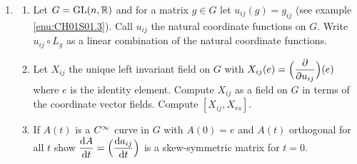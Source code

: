 \documentclass[../main]{subfiles}
\begin{document}
\begin{enumerate}
\item\label{pro:21}
\begin{enumerate}[label=(\roman{enumii})]
    \item Let $G=\mathrm{GL}(n,\mathbb{R})$ and for a matrix $g \in G$ let $u_{i j} (g) = g_{i  j}$ (see example \ref{enu:CH01S01.3}). Call $u_{i  j}$ the natural coordinate functions on $G$. Write $u_{i  j} \circ L_g$ as a linear combination of the natural coordinate functions.
    \item Let $X_{i  j}$ the unique left invariant field on $G$ with $X_{i  j} (e) = \Big(\dfrac{\partial }{\partial u_{i  j}}\Big)(e)$ where $e$ is the identity element. Compute $X_{i  j}$ as a field on $G$ in terms of the coordinate vector fields. Compute $[X_{i  j}, X_{r  s}]$.
    \item If $A(t)$ is a $C^\infty$ curve in $G$ with $A(0)=e$ and $A(t)$ orthogonal for all $t$ show $\dfrac{\mathrm{d}A}{\mathrm{d}t} = \Big(\dfrac{\mathrm{d}a_{ij}}{\mathrm{d}t}\Big)$ is a skew-symmetric matrix for $t=0$. 
\end{enumerate}


\end{enumerate}
\end{document}
